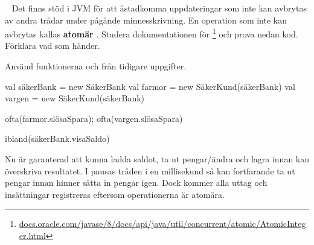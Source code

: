 \QUESTEND







\QUESTBEGIN

\Task  \what~  Det finns stöd i JVM för att åstadkomma uppdateringar som inte kan avbrytas av andra trådar under pågånde minnesskrivning. En operation som inte kan avbrytas kallas \textbf{atomär} . Studera dokumentationen för \footnote{\href{https://docs.oracle.com/javase/8/docs/api/java/util/concurrent/atomic/AtomicInteger.html}{docs.oracle.com/javase/8/docs/api/java/util/concurrent/atomic/AtomicInteger.html}} och prova nedan kod. Förklara vad som händer.

Använd funktionerna  och  från tidigare uppgifter.
\begin{REPL}
val säkerBank = new SäkerBank
val farmor = new SäkerKund(säkerBank)
val vargen = new SäkerKund(säkerBank)

ofta(farmor.slösaSpara); ofta(vargen.slösaSpara)

ibland(säkerBank.visaSaldo)
\end{REPL}





\SOLUTION


\TaskSolved \what

Nu är  garanterad att kunna ladda saldot, ta ut pengar/ändra och lagra innan  kan överskriva resultatet. I  pausas tråden i en millisekund så  kan fortfarande ta ut pengar innan  hinner sätta in pengar igen. Dock kommer alla uttag och insättningar registreras eftersom operationerna är atomära.


\QUESTEND






